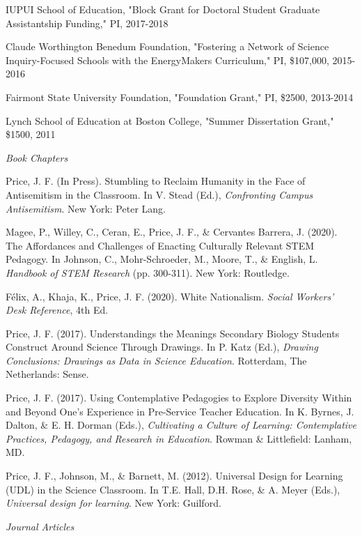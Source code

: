 \documentclass[11pt,article,oneside]{memoir}
\begin{document}
\ind IUPUI School of Education, "Block Grant for Doctoral Student Graduate Assistantship Funding," PI, 2017-2018

\ind Claude Worthington Benedum Foundation, "Fostering a Network of Science Inquiry-Focused Schools with the EnergyMakers Curriculum," PI, \$107,000, 2015-2016

\ind Fairmont State University Foundation, "Foundation Grant," PI, \$2500, 2013-2014

\ind Lynch School of Education at Boston College, "Summer Dissertation Grant," \$1500, 2011


\bigskip

\medskip
\noindent\emph{Book Chapters \vspace{0.01in}}

\ind Price, J. F. (In Press). Stumbling to Reclaim Humanity in the Face of Antisemitism in the Classroom. In V. Stead (Ed.), \textit{Confronting Campus Antisemitism}. New York: Peter Lang.

\ind Magee, P., Willey, C., Ceran, E., Price, J. F., \& Cervantes Barrera, J. (2020). The Affordances and Challenges of Enacting Culturally Relevant STEM Pedagogy. In Johnson, C., Mohr-Schroeder, M., Moore, T., \& English, L. \textit{Handbook of STEM Research} (pp. 300-311). New York: Routledge.

\ind Félix, A., Khaja, K., Price, J. F. (2020). White Nationalism. \textit{Social Workers' Desk Reference}, 4th Ed.

\ind Price, J. F. (2017). Understandings the Meanings Secondary Biology Students Construct Around Science Through Drawings. In P. Katz (Ed.), \textit{Drawing Conclusions: Drawings as Data in Science Education}. Rotterdam, The Netherlands: Sense.

\ind Price, J. F. (2017). Using Contemplative Pedagogies to Explore Diversity Within and Beyond One’s Experience in Pre-Service Teacher Education. In K. Byrnes, J. Dalton, \& E. H. Dorman (Eds.), \textit{Cultivating a Culture of Learning: Contemplative Practices, Pedagogy, and Research in Education}. Rowman \& Littlefield: Lanham, MD.

\ind Price, J. F., Johnson, M., \& Barnett, M. (2012). Universal Design for Learning (UDL) in the Science Classroom. In T.E. Hall, D.H. Rose, \& A. Meyer (Eds.), \textit{Universal design for learning}. New York: Guilford.

\bigskip
\noindent\emph{Journal Articles \vspace{0.05in}}
\end{document}
